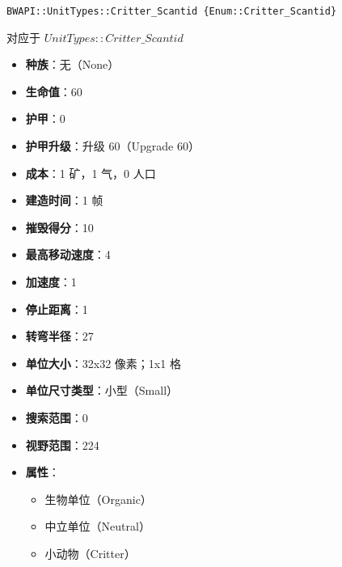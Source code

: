 \begin{tcolorbox}[colback=white, colframe=black!60!white, title=Critter\_Scantid(), arc=0mm]
    \begin{verbatim}
BWAPI::UnitTypes::Critter_Scantid {Enum::Critter_Scantid}
    \end{verbatim}
    对应于  $UnitTypes::Critter\_Scantid$ 
    \begin{itemize}
        \item \textbf{种族}：无（None）
        \item \textbf{生命值}：60
        \item \textbf{护甲}：0
        \item \textbf{护甲升级}：升级 60（Upgrade 60）
        \item \textbf{成本}：1 矿，1 气，0 人口
        \item \textbf{建造时间}：1 帧
        \item \textbf{摧毁得分}：10
        \item \textbf{最高移动速度}：4
        \item \textbf{加速度}：1
        \item \textbf{停止距离}：1
        \item \textbf{转弯半径}：27
        \item \textbf{单位大小}：32x32 像素；1x1 格
        \item \textbf{单位尺寸类型}：小型（Small）
        \item \textbf{搜索范围}：0
        \item \textbf{视野范围}：224
        \item \textbf{属性}：
            \begin{itemize}
                \item 生物单位（Organic）
                \item 中立单位（Neutral）
                \item 小动物（Critter）
            \end{itemize}
    \end{itemize}
\end{tcolorbox}

